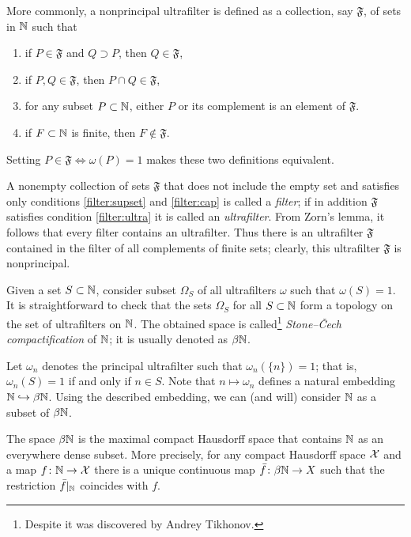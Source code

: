 More commonly, a nonprincipal ultrafilter is defined as a collection, say $\mathfrak{F}$, of sets in $\mathbb{N}$ such that
\begin{enumerate}
\item\label{filter:supset} if $P\in \mathfrak{F}$ and $Q\supset P$, then $Q\in \mathfrak{F}$,
\item\label{filter:cap} if $P, Q\in \mathfrak{F}$, then $P\cap Q\in \mathfrak{F}$,
\item\label{filter:ultra} for any subset $P\subset\mathbb{N}$, either $P$ or its complement is an element of $\mathfrak{F}$.
\item\label{filter:non-prin} if $F\subset \mathbb{N} $ is finite, then $F\notin \mathfrak{F}$.
\end{enumerate}
Setting $P\in\mathfrak{F}\Leftrightarrow\omega(P)=1$ makes these two definitions equivalent.

A nonempty collection of sets $\mathfrak{F}$ that does not include the empty set and satisfies only conditions \ref{filter:supset} and \ref{filter:cap} is called a \emph{filter}; 
if in addition $\mathfrak{F}$ satisfies condition \ref{filter:ultra} it is called an \emph{ultrafilter}.
From Zorn's lemma, it follows that every filter contains an ultrafilter.
Thus there is an ultrafilter $\mathfrak{F}$ contained in the filter of all complements of finite sets; clearly, this ultrafilter $\mathfrak{F}$ is nonprincipal.


Given a set $S\subset \mathbb{N}$, consider subset $\Omega_S$ of all ultrafilters $\omega$ such that $\omega(S)=1$.
It is straightforward to check that the sets $\Omega_S$ for all $S\subset \mathbb{N}$ form a topology on the set of ultrafilters on $\mathbb{N}$. 
The obtained space is called\footnote{Despite it was discovered by Andrey Tikhonov.} \emph{Stone--\v{C}ech compactification} of $\mathbb{N}$;
it is usually denoted as $\beta\mathbb{N}$.

Let $\omega_n$ denotes the principal ultrafilter such that $\omega_n(\{n\})=1$; that is, $\omega_n(S)=1$ if and only if $n\in S$.
Note that $n\mapsto\omega_n$ defines a natural embedding $\mathbb{N}\hookrightarrow\beta\mathbb{N}$. 
Using the described embedding, we can (and will) consider $\mathbb{N}$ as a subset of $\beta\mathbb{N}$.

The space $\beta\mathbb{N}$ is the maximal compact Hausdorff space that contains $\mathbb{N}$  as an everywhere dense subset.
More precisely, for any compact Hausdorff space $\mathcal{X}$ 
and a map $f\colon\mathbb{N}\to \mathcal{X}$ there is a unique continuous map $\bar f\colon\beta\mathbb{N}\to X$ such that the restriction $\bar f|_{\mathbb{N}}$ coincides with $f$. 

